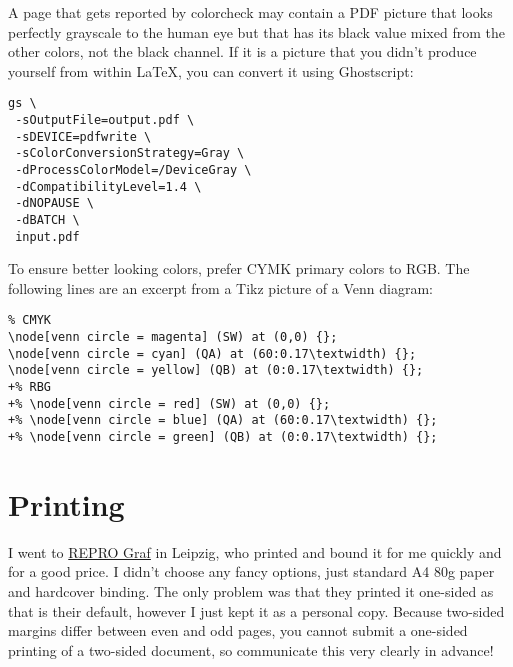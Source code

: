 A page that gets reported by colorcheck may contain a PDF picture that looks perfectly grayscale to the human eye but that has its black value mixed from the other colors, not the black channel.
If it is a picture that you didn't produce yourself from within LaTeX, you can convert it using Ghostscript:

\begin{lstlisting}
gs \
 -sOutputFile=output.pdf \
 -sDEVICE=pdfwrite \
 -sColorConversionStrategy=Gray \
 -dProcessColorModel=/DeviceGray \
 -dCompatibilityLevel=1.4 \
 -dNOPAUSE \
 -dBATCH \
 input.pdf 
\end{lstlisting}

To ensure better looking colors, prefer CYMK primary colors to RGB.
The following lines are an excerpt from a Tikz picture of a Venn diagram:

\begin{lstlisting}
% CMYK
\node[venn circle = magenta] (SW) at (0,0) {};
\node[venn circle = cyan] (QA) at (60:0.17\textwidth) {};
\node[venn circle = yellow] (QB) at (0:0.17\textwidth) {};
+% RBG
+% \node[venn circle = red] (SW) at (0,0) {};
+% \node[venn circle = blue] (QA) at (60:0.17\textwidth) {};
+% \node[venn circle = green] (QB) at (0:0.17\textwidth) {};
\end{lstlisting}

\section{Printing}
I went to \href{https://reprograf-leipzig.de/}{REPRO Graf} in Leipzig, who printed and bound it for me quickly and for a good price.
I didn't choose any fancy options, just standard A4 80g paper and hardcover binding.
The only problem was that they printed it one-sided as that is their default, however I just kept it as a personal copy.
Because two-sided margins differ between even and odd pages, you cannot submit a one-sided printing of a two-sided document, so communicate this very clearly in advance!
